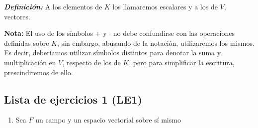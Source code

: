 \documentclass[11pt]{article}
\newcommand{\bfit}[1]{\textbf{\textit{#1}}}
\begin{document}
\bfit{Definición:} A los elementos de $K$ los llamaremos escalares y a los de $V$, vectores.

\textbf{Nota:} El uso de los símbolos $+$ y $\cdot$ no debe confundirse con las operaciones definidas sobre $K$, sin embargo, abusando de la notación, utilizaremos los mismos. Es decir, deberíamos utilizar símbolos distintos para denotar la suma y multiplicación en $V$, respecto de los de $K$, pero para simplificar la escritura, prescindiremos de ello.

\subsection*{Lista de ejercicios 1 (LE1)}
\begin{enumerate}
    \item Sea $F$ un campo y un espacio vectorial sobre sí mismo
\end{enumerate}
\end{document}
